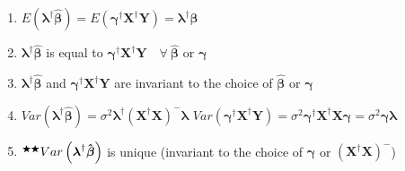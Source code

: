 \documentclass{article}
\begin{document}
\begin{enumerate}
\item $E\left( \mathbf{\lambda }^{\dagger }\mathbf{\hat{\beta}}\right)
=E\left( \mathbf{\gamma }^{\dagger }\mathbf{X}^{\dagger }\mathbf{Y}\right) =%
\mathbf{\lambda }^{\dagger }\mathbf{\beta }$

\item $\mathbf{\lambda }^{\dagger }\mathbf{\hat{\beta}}$ is equal to $%
\mathbf{\gamma }^{\dagger }\mathbf{X}^{\dagger }\mathbf{Y\quad \forall \ 
\hat{\beta}}$ or $\mathbf{\gamma }$

\item $\mathbf{\lambda }^{\dagger }\mathbf{\hat{\beta}}$ and $\mathbf{\gamma 
}^{\dagger }\mathbf{X}^{\dagger }\mathbf{Y}$ are invariant to the choice of $%
\mathbf{\hat{\beta}}$ or $\mathbf{\gamma }$

\item $Var\left( \mathbf{\lambda }^{\dagger }\mathbf{\hat{\beta}}\right)
=\sigma ^{2}\mathbf{\lambda }^{\dagger }\left( \mathbf{X}^{\dagger }\mathbf{X%
}\right) ^{-}\mathbf{\lambda }$\newline
$Var\left( \mathbf{\gamma }^{\dagger }\mathbf{X}^{\dagger }\mathbf{Y}\right)
=\sigma ^{2}\mathbf{\gamma }^{\dagger }\mathbf{X}^{\dagger }\mathbf{X\gamma =%
}\sigma ^{2}\mathbf{\gamma \lambda }$

\item $^{\bigstar \bigstar }Var\left( \mathbf{\lambda }^{\dagger }\mathbf{%
\hat{\beta}}\right) $ is unique (invariant to the choice of $\mathbf{\gamma }
$ or $\left( \mathbf{X}^{\dagger }\mathbf{X}\right) ^{-}$)
\end{enumerate}
\end{document}
